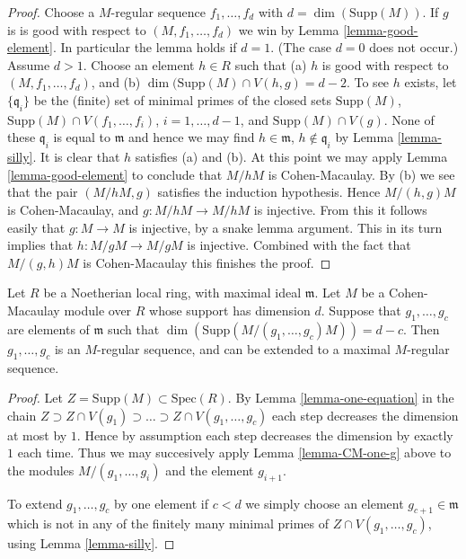 \begin{proof}
Choose a $M$-regular sequence $f_1, \ldots, f_d$ with
$d = \dim(\text{Supp}(M))$. If $g$ is is good with respect to
$(M, f_1, \ldots, f_d)$ we win by Lemma \ref{lemma-good-element}.
In particular the lemma holds if $d = 1$. (The case $d = 0$ does
not occur.) Assume $d > 1$. Choose an element $h \in R$ such that
(a) $h$ is good with respect to $(M, f_1, \ldots, f_d)$,
and (b) $\dim( \text{Supp}(M) \cap V(h, g) = d - 2$.
To see $h$ exists, let $\{\mathfrak q_i\}$ be the (finite) set of
minimal primes of the closed sets $\text{Supp}(M)$,
$\text{Supp}(M)\cap V(f_1, \ldots, f_i)$, $i = 1, \ldots, d-1$,
and $\text{Supp}(M) \cap V(g)$. None of these $\mathfrak q_i$
is equal to $\mathfrak m$ and hence we may find $h \in \mathfrak m$,
$h \not \in \mathfrak q_i$ by Lemma \ref{lemma-silly}. It is clear
that $h$ satisfies (a) and (b). At this point we may
apply Lemma \ref{lemma-good-element} to conclude that
$M/hM$ is Cohen-Macaulay. By (b) we see that the pair
$(M/hM, g)$ satisfies the induction hypothesis. Hence
$M/(h, g)M$ is Cohen-Macaulay, and $g : M/hM \to M/hM$
is injective. From this it follows easily that
$g : M \to M$ is injective, by a snake lemma argument.
This in its turn implies that $h : M/gM \to M/gM$
is injective. Combined with the fact that $M/(g, h)M$
is Cohen-Macaulay this finishes the proof.
\end{proof}

\begin{proposition}
\label{proposition-CM-module}
Let $R$ be a Noetherian local ring, with maximal ideal $\mathfrak m$.
Let $M$ be a Cohen-Macaulay module over $R$ whose support has dimension $d$.
Suppose that $g_1, \ldots, g_c$ are elements of
$\mathfrak m$ such that $\dim(\text{Supp}(M/(g_1, \ldots, g_c)M))
= d - c$. Then $g_1, \ldots, g_c$ is an $M$-regular sequence,
and can be extended to a maximal $M$-regular sequence.
\end{proposition}

\begin{proof}
Let $Z = \text{Supp}(M) \subset \text{Spec}(R)$.
By Lemma \ref{lemma-one-equation} in the chain
$Z \supset Z \cap V(g_1) \supset \ldots \supset Z \cap V(g_1, \ldots, g_c)$
each step decreases the dimension at most by $1$. Hence by assumption
each step decreases the dimension by exactly $1$ each time. Thus we
may succesively apply Lemma \ref{lemma-CM-one-g} above to the modules
$M/(g_1, \ldots, g_i)$ and the element $g_{i + 1}$.

\medskip\noindent
To extend $g_1, \ldots, g_c$ by one element if $c < d$ we simply
choose an element $g_{c + 1} \in \mathfrak m$ which is not
in any of the finitely many minimal primes of $Z \cap V(g_1, \ldots, g_c)$,
using Lemma \ref{lemma-silly}.
\end{proof}












